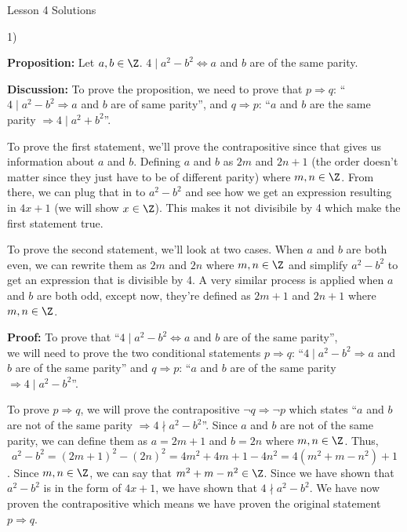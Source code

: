 

    

    \begin{center}
        \huge \sc Lesson 4 Solutions
    \end{center}

    \begin{paragraph}{1)}

        \textbf{Proposition:} Let $a, b \in \Z$. $4 \mid a^2 - b^2 \iff a$ and $b$ are of the same parity.
        \spacing

        \textbf{Discussion:} To prove the proposition, we need to prove that 
        $p \Rightarrow q$: ``$4 \mid a^2 - b^2 \Rightarrow a$ and $b$ are of same parity'',
        and $q \Rightarrow p$: ``$a$ and $b$ are the same parity $\Rightarrow 4 \mid a^2 + b^2$''.
        \spacing

        To prove the first statement, we'll prove the contrapositive
        since that gives us information about $a$ and $b$. Defining $a$ and 
        $b$ as $2m$ and $2n +1$ (the order doesn't matter since they just
        have to be of different parity) where $m, n \in \Z$. From there, 
        we can plug that in to $a^2 - b^2$ and see how we get an expression resulting in 
        $4x + 1$ (we will show $x \in \Z$). This makes it not divisibile by 4 which 
        make the first statement true.
        \spacing

        To prove the second statement, we'll look at two cases. When $a$ and $b$
        are both even, we can rewrite them as $2m$ and $2n$ where $m, n \in \Z$ and simplify
        $a^2 - b^2$ to get an expression that is divisible by 4. A very similar process is applied
        when $a$ and $b$ are both odd, except now, they're defined as $2m + 1$
        and $2n + 1$ where $m, n \in \Z$.
        \spacing

        \textbf{Proof:} To prove that ``$4 \mid a^2 - b^2 \iff a$ and $b$ are of the same parity'',\\ 
        we will need to prove the two conditional statements $p \Rightarrow q$: ``$4 \mid a^2 - b^2 \Rightarrow a$
        and $b$ are of the same parity'' and $q \Rightarrow p$: ``$a$ and $b$ are of the same parity $\Rightarrow 4 \mid a^2 - b^2$''.
        \spacing

        To prove $p \Rightarrow q$, we will prove the contrapositive $\neg q \Rightarrow \neg p$ which states
        ``$a$ and $b$ are not of the same parity $\Rightarrow 4 \nmid a^2 - b^2$''. Since $a$ and $b$ are not 
        of the same parity, we can define them as $a = 2m + 1$ and $b = 2n$ where $m, n \in \Z$. Thus,
        $$a^2 - b^2 = (2m + 1)^2 - (2n)^2 = 4m^2 + 4m + 1 - 4n^2 = 4(m^2 + m - n^2) + 1$$.
        Since $m, n \in \Z$, we can say that $m^2 + m - n^2 \in \Z$. Since we have shown that $a^2 - b^2$
        is in the form of $4x + 1$, we have shown that $4 \nmid a^2 - b^2$. We have now proven the contrapositive
        which means we have proven the original statement $p \Rightarrow q$.
        \spacing


\end{paragraph}
